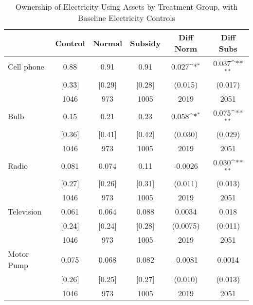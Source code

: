 \begin{table}[htbp]\centering
\def\sym#1{\ifmmode^{#1}\else\(^{#1}\)\fi}
\caption{Ownership of Electricity-Using Assets by Treatment Group, with Baseline Electricity Controls \label{tab:"balance"}}
\begin{tabular*}{0.9\hsize}{@{\hskip\tabcolsep\extracolsep\fill}l*{1}{ccccc}}
\toprule
                                &  Control&   Normal&  Subsidy&Diff Norm         &Diff Subs         \\
\midrule
Cell phone                      &     0.88&     0.91&     0.91&    0.027\sym{*}  &    0.037\sym{**} \\
                                &   [0.33]&   [0.29]&   [0.28]&  (0.015)         &  (0.017)         \\
                                &     1046&      973&     1005&     2019         &     2051         \\
Bulb                            &     0.15&     0.21&     0.23&    0.058\sym{*}  &    0.075\sym{**} \\
                                &   [0.36]&   [0.41]&   [0.42]&  (0.030)         &  (0.029)         \\
                                &     1046&      973&     1005&     2019         &     2051         \\
Radio                           &    0.081&    0.074&     0.11&  -0.0026         &    0.030\sym{**} \\
                                &   [0.27]&   [0.26]&   [0.31]&  (0.011)         &  (0.013)         \\
                                &     1046&      973&     1005&     2019         &     2051         \\
Television                      &    0.061&    0.064&    0.088&   0.0034         &    0.018         \\
                                &   [0.24]&   [0.24]&   [0.28]& (0.0075)         &  (0.011)         \\
                                &     1046&      973&     1005&     2019         &     2051         \\
Motor Pump                      &    0.075&    0.068&    0.082&  -0.0081         &   0.0014         \\
                                &   [0.26]&   [0.25]&   [0.27]&  (0.010)         &  (0.013)         \\
                                &     1046&      973&     1005&     2019         &     2051         \\

\end{tabular*}
\end{table}
